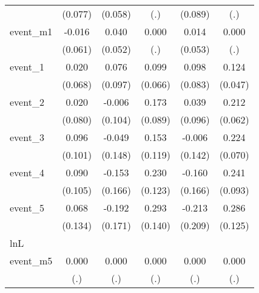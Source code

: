 {\begin{tabular}{l*{5}{c}}
            &     (0.077)         &     (0.058)         &         (.)         &     (0.089)         &         (.)         \\
[1em]
event\_m1    &      -0.016         &       0.040         &       0.000         &       0.014         &       0.000         \\
            &     (0.061)         &     (0.052)         &         (.)         &     (0.053)         &         (.)         \\
[1em]
event\_1     &       0.020         &       0.076         &       0.099         &       0.098         &       0.124\sym{**} \\
            &     (0.068)         &     (0.097)         &     (0.066)         &     (0.083)         &     (0.047)         \\
[1em]
event\_2     &       0.020         &      -0.006         &       0.173         &       0.039         &       0.212\sym{***}\\
            &     (0.080)         &     (0.104)         &     (0.089)         &     (0.096)         &     (0.062)         \\
[1em]
event\_3     &       0.096         &      -0.049         &       0.153         &      -0.006         &       0.224\sym{**} \\
            &     (0.101)         &     (0.148)         &     (0.119)         &     (0.142)         &     (0.070)         \\
[1em]
event\_4     &       0.090         &      -0.153         &       0.230         &      -0.160         &       0.241\sym{**} \\
            &     (0.105)         &     (0.166)         &     (0.123)         &     (0.166)         &     (0.093)         \\
[1em]
event\_5     &       0.068         &      -0.192         &       0.293\sym{*}  &      -0.213         &       0.286\sym{*}  \\
            &     (0.134)         &     (0.171)         &     (0.140)         &     (0.209)         &     (0.125)         \\
\hline
lnL         &                     &                     &                     &                     &                     \\
event\_m5    &       0.000         &       0.000         &       0.000         &       0.000         &       0.000         \\
            &         (.)         &         (.)         &         (.)         &         (.)         &         (.)         \\

\end{tabular}}
